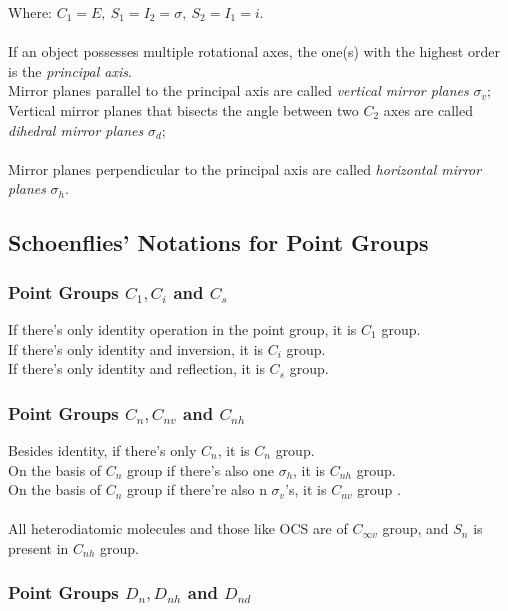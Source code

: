 		Where: $C_1 = E, \ S_1 = I_2 = \sigma, \ S_2 = I_1 = i$.\label{8.2.1} \\\ \\
		If an object possesses multiple rotational axes, the one(s) with the highest order is the \emph{principal axis}.\\
		Mirror planes parallel to the principal axis are called \emph{vertical mirror planes} $\sigma_v$;\\
		Vertical mirror planes that bisects the angle between two $C_2$ axes are called \emph{dihedral mirror planes} $\sigma_d$;\\\ \\
		Mirror planes perpendicular to the principal axis are called \emph{horizontal mirror planes} $\sigma_h$.

	\subsection{Schoenflies' Notations for Point Groups}
	
		\subsubsection{Point Groups $C_1, C_i$ and $C_s$}
		
			If there's only identity operation in the point group, it is $C_1$ group.\\
			If there's only identity and inversion, it is $C_i$ group.\\
			If there's only identity and reflection, it is $C_s$ group.
			
		\subsubsection{Point Groups $C_n, C_{nv}$ and $C_{nh}$}
		
			Besides identity, if there's only $C_n$, it is $C_n$ group. \\
			On the basis of $C_n$ group if there's also one $\sigma_h$, it is $C_{nh}$ group. \\
			On the basis of $C_n$ group if there're also n $\sigma_v$'s, it is $C_{nv}$ group .\\\ \\
			All heterodiatomic molecules and those like OCS are of $C_{\infty v}$ group, and $S_n$ is present in $C_{nh}$ group.
			
		\subsubsection{Point Groups $D_n, D_{nh}$ and $D_{nd}$}
		
